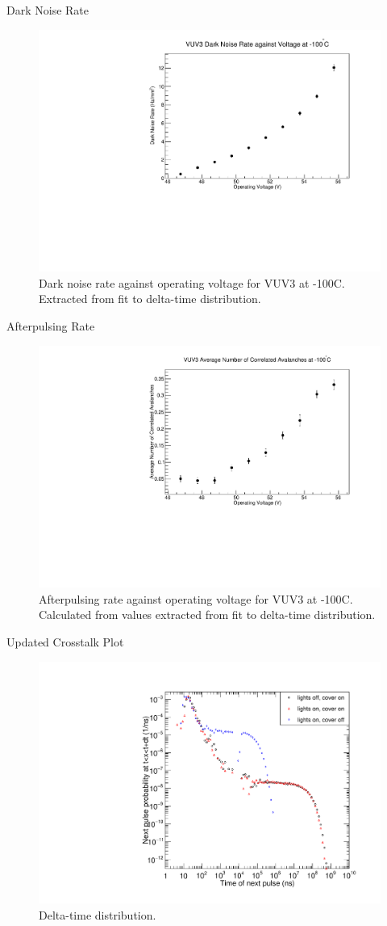 \documentclass{beamer}
\begin{document}
\begin{frame}{Dark Noise Rate}
\begin{figure}
\centering
\includegraphics[height=0.5\textwidth]{VUV3_DN_vs_V.pdf}
\caption{Dark noise rate against operating voltage for VUV3 at -100C. Extracted from fit to delta-time distribution.}
\end{figure}
\end{frame}

\begin{frame}{Afterpulsing Rate}
\begin{figure}
\centering
\includegraphics[height=0.5\textwidth]{VUV3_AP2_vs_V.pdf}
\caption{Afterpulsing rate against operating voltage for VUV3 at -100C. Calculated from values extracted from fit to delta-time distribution.}
\end{figure}
\end{frame}

\begin{frame}{Updated Crosstalk Plot}
\begin{figure}
\centering
\includegraphics[height=0.5\textwidth]{LightLeak.pdf}
\caption{Delta-time distribution.}
\end{figure}
\end{frame}
\end{document}
